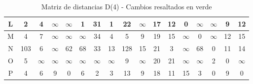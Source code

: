 \documentclass[12pt]{article}
\begin{document}
\begin{table}[h!]
\begin{tabular}{|c|c|c|c|c|c|c|c|c|c|c|c|c|c|c|c|c|}
L & 2 & 4 & $\infty$ & $\infty$ & 1 & 31 & 1 & 22 & $\infty$ & 17 & 12 & 0 & $\infty$ & $\infty$ & 9 & 12 \\\hline
M & 4 & 7 & $\infty$ & $\infty$ & $\infty$ & 34 & 4 & 5 & 9 & 19 & 15 & $\infty$ & 0 & $\infty$ & 12 & 15 \\\hline
N & \cellcolor{lightgreen} 103 & 6 & $\infty$ & 62 & \cellcolor{lightgreen} 68 & 33 & 13 & \cellcolor{lightgreen} 128 & 15 & 21 & 3 & $\infty$ & \cellcolor{lightgreen} 68 & 0 & 11 & 14 \\\hline
O & 5 & $\infty$ & $\infty$ & $\infty$ & $\infty$ & $\infty$ & $\infty$ & 9 & $\infty$ & 20 & 21 & $\infty$ & $\infty$ & 2 & 0 & $\infty$ \\\hline
P & 4 & 6 & 9 & 0 & \cellcolor{lightgreen} 6 & 2 & 3 & 13 & \cellcolor{lightgreen} 9 & 18 & 11 & 15 & 3 & 0 & 9 & 0 \\\hline
\end{tabular}
\caption{Matriz de distancias D(4) - Cambios resaltados en verde}
\end{table}
\end{document}
